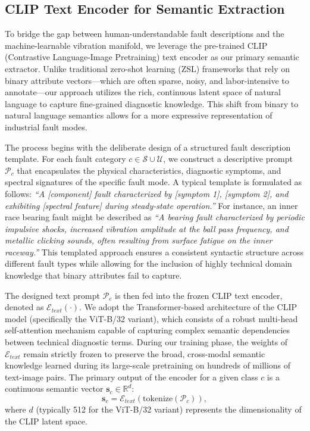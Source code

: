 \subsection{CLIP Text Encoder for Semantic Extraction}
\label{sec:method_clip_text_encoder}

To bridge the gap between human-understandable fault descriptions and the machine-learnable vibration manifold, we leverage the pre-trained CLIP (Contrastive Language-Image Pretraining) text encoder as our primary semantic extractor. Unlike traditional zero-shot learning (ZSL) frameworks that rely on binary attribute vectors—which are often sparse, noisy, and labor-intensive to annotate—our approach utilizes the rich, continuous latent space of natural language to capture fine-grained diagnostic knowledge. This shift from binary to natural language semantics allows for a more expressive representation of industrial fault modes.

The process begins with the deliberate design of a structured fault description template. For each fault category $c \in \mathcal{S} \cup \mathcal{U}$, we construct a descriptive prompt $\mathcal{P}_c$ that encapsulates the physical characteristics, diagnostic symptoms, and spectral signatures of the specific fault mode. A typical template is formulated as follows: \textit{``A [component] fault characterized by [symptom 1], [symptom 2], and exhibiting [spectral feature] during steady-state operation.''} For instance, an inner race bearing fault might be described as \textit{``A bearing fault characterized by periodic impulsive shocks, increased vibration amplitude at the ball pass frequency, and metallic clicking sounds, often resulting from surface fatigue on the inner raceway.''} This templated approach ensures a consistent syntactic structure across different fault types while allowing for the inclusion of highly technical domain knowledge that binary attributes fail to capture.

The designed text prompt $\mathcal{P}_c$ is then fed into the frozen CLIP text encoder, denoted as $\mathcal{E}_{text}(\cdot)$. We adopt the Transformer-based architecture of the CLIP model (specifically the ViT-B/32 variant), which consists of a robust multi-head self-attention mechanism capable of capturing complex semantic dependencies between technical diagnostic terms. During our training phase, the weights of $\mathcal{E}_{text}$ remain strictly frozen to preserve the broad, cross-modal semantic knowledge learned during its large-scale pretraining on hundreds of millions of text-image pairs. The primary output of the encoder for a given class $c$ is a continuous semantic vector $\mathbf{s}_c \in \mathbb{R}^d$:
\begin{equation}
    \mathbf{s}_c = \mathcal{E}_{text}(\text{tokenize}(\mathcal{P}_c)),
\end{equation}
where $d$ (typically 512 for the ViT-B/32 variant) represents the dimensionality of the CLIP latent space.

